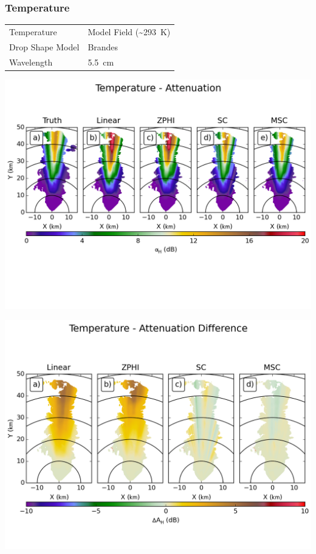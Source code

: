 \documentclass[red]{beamer}
\begin{document}
\begin{frame}
	\frametitle{Temperature}
	\begin{center}
	    \begin{tabular}{ | l | l | }
	        \hline
	        Temperature & Model Field (\textasciitilde\SI{293}{\kelvin}) \\
	        Drop Shape Model & Brandes \\
	        Wavelength & \SI{5.5}{\centi\meter} \\
			\hline
	    \end{tabular}
	\end{center}	
\end{frame}

\begin{frame}
	\begin{center}
		\includegraphics[scale=0.55]{figures/C_Temperature_Attenuation.png}
	\end{center}
\end{frame}

\begin{frame}
	\begin{center}
		\includegraphics[scale=0.45]{figures/C_Temperature_Attenuation_Difference.png}
	\end{center}
\end{frame}
\end{document}
